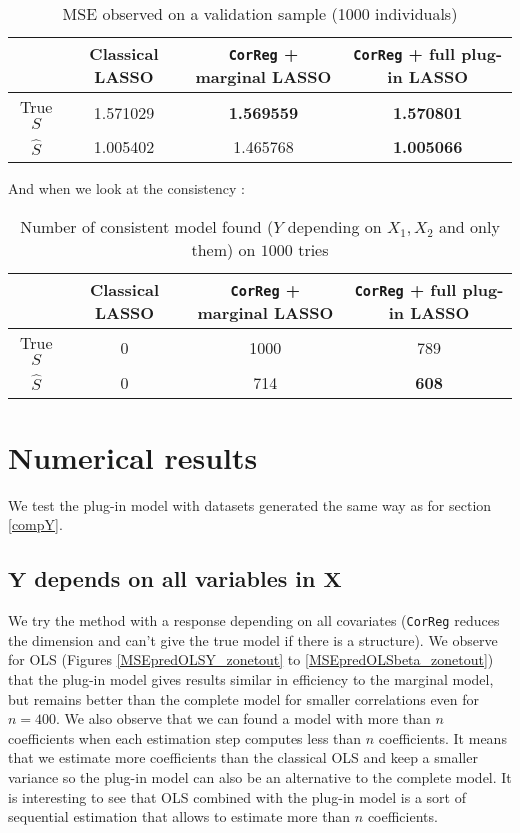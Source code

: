 \documentclass[12pt,a4paper]{report}
\begin{document}
		
		\begin{table}[h!]
		\centering
		\begin{tabular}{|c|c|c|c|}
		\hline 
		 & Classical LASSO & {\tt CorReg} + marginal LASSO& {\tt CorReg} + full plug-in LASSO \\ 
		\hline 
		True $S$ &  1.571029 & \textbf{1.569559} & \textbf{1.570801} \\ 
		\hline 
		$\hat{S}$ & 1.005402 & 1.465768 & \textbf{1.005066} \\ 
		\hline 
		\end{tabular} 
		\caption{MSE observed on a validation sample (1000 individuals)}
		\end{table}

		And when we look at the consistency :
		\begin{table}[h!]
		\centering	
		\begin{tabular}{|c|c|c|c|}
		\hline 
		 & Classical LASSO & {\tt CorReg} + marginal LASSO& {\tt CorReg} + full plug-in LASSO \\ 
		\hline 
		True $S$ &  0 & 1000 & 789 \\ 
		\hline 
		$\hat{S}$ & 0 & 714 & \textbf{608} \\ 
		\hline 
		\end{tabular} 
		\caption{Number of consistent model found ($Y$ depending on $X_1,X_2$ and only them) on $1000$ tries}\label{testidentifiableGM}
		\end{table}				
				
		
		

	\section{Numerical results}
		We test the plug-in model with datasets generated the same way as for section \ref{compY}.
	\subsection{$\boldsymbol{Y}$ depends on all variables in $\boldsymbol{X}$}	 	
We try the method with a response depending on all covariates ({\tt CorReg} reduces the dimension and can't give the true model if there is a structure). We observe for OLS (Figures \ref{MSEpredOLSY_zonetout} to \ref{MSEpredOLSbeta_zonetout}) that the plug-in model gives results similar in efficiency to the marginal model, but remains better than the complete model for smaller  correlations even for $n=400$. We also observe that we can found a model with more than $n$ coefficients when each estimation step computes less than $n$ coefficients. It means that  we estimate more coefficients than the classical OLS and keep a smaller variance so the plug-in model can also be an alternative to the complete model. It is interesting to see that OLS combined with the plug-in model is a sort of sequential estimation that allows to estimate more than $n$ coefficients.
 
\end{document}
